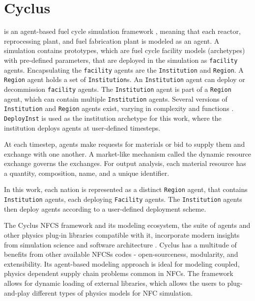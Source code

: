 \section{Cyclus}

\Cyclus is an agent-based fuel cycle simulation framework 
\cite{huff_fundamental_2016}, meaning
that each reactor, reprocessing plant, and fuel fabrication plant is modeled as an agent.
A \Cyclus simulation contains prototypes, which are fuel cycle facility models (archetypes) with
pre-defined parameters, that are deployed in the simulation as \texttt{facility} agents.
Encapsulating the \texttt{facility} agents are the \texttt{Institution} and \texttt{Region}.
A \texttt{Region} agent holds a set of \texttt{Institution}s. 
An \texttt{Institution} agent can deploy or decommission \texttt{facility} agents.
The \texttt{Institution} agent is part of a \texttt{Region} agent,
which can contain multiple \texttt{Institution} agents. Several versions of \texttt{Institution}
and \texttt{Region} agents exist, varying in complexity and functions \cite{huff_extensions_2014}.
\texttt{DeployInst} is used as the institution archetype for this work, where the institution
deploys agents at user-defined timesteps. 

At each timestep,
agents make requests for materials or bid to supply them and exchange
with one another. A market-like mechanism called the dynamic resource exchange
\cite{gidden_agent-based_2015} governs the exchanges.
For output analysis, each material resource has a quantity, composition, name, and a unique identifier.

In this work, each nation is represented as a distinct \texttt{Region} agent,
that contains \texttt{Institution} agents, each deploying  \texttt{Facility} 
agents. The \texttt{Institution} agents then deploy agents according to 
a user-defined deployment scheme.

The Cyclus \gls{NFCS} framework and its
modeling ecosystem, the suite of agents and other
physics plug-in libraries compatible with it, incorporate
modern insights from simulation science and software
architecture \cite{huff_fundamental_2016}. Cyclus
has a multitude of benefits from other available
\glspl{NFCS} codes - open-sourceness, modularity,
and extensibility. Its agent-based modeling approach
is ideal for modeling coupled, physics dependent
supply chain problems common in \glspl{NFC}.
The framework allows for dynamic loading of 
external libraries, which allows the users to plug-and-play
different types of physics models for \gls{NFC}
simulation.

